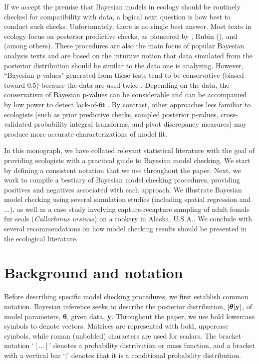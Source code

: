 \documentclass[12pt,english]{article}
\begin{document}
\begin{spacing}{1.9}
If we accept the premise that Bayesian models in ecology should be routinely checked for compatibility with data, a logical next question is how best to conduct such checks.  Unfortunately, there is no single best answer.  Most texts in ecology \citep[e.g.,][]{KingEtAl2009,LinkBarker2010,KerySchaub2012} focus on posterior predictive checks, as pioneered by \citet{Guttman1967}, Rubin (\citeyear{Rubin1981,Rubin1984}), and \citet{GelmanEtAl1996} (among others).  These procedures are also the main focus of popular Bayesian analysis texts \citep[e.g.,][]{CressieWikle2011,GelmanEtAl2014} and are based on the intuitive notion that data simulated from the posterior distribution should be similar to the data one is analyzing.  However, ``Bayesian p-values" generated from these tests tend to be conservative (biased toward 0.5) because the data are used twice \citep[once to fit the model and once to test the model;][]{BayarriBerger2000,RobinsEtAl2000}.  Depending on the data, the conservatism of Bayesian p-values can be considerable \citep{Zhang2014} and can be accompanied by low power to detect lack-of-fit \citep{YuanJohnson2012,Zhang2014}. By contrast, other approaches less familiar to ecologists (such as prior predictive checks, sampled posterior p-values, cross-validated probability integral transforms, and pivot discrepancy measures) may produce more accurate characterizations of model fit.

In this monograph, we have collated relevant statistical literature with the goal of providing ecologists with a practical guide to Bayesian model checking.  We start by defining a consistent notation that we use throughout the paper. Next, we work to compile a bestiary of Bayesian model checking procedures, providing positives and negatives associated with each approach.  We illustrate Bayesian model checking using several simulation studies (including spatial regression and ...), as well as a case study involving capture-recapture sampling of adult female fur seals (\textit{Callorhinus ursinus}) on a rookery in Alaska, U.S.A..  We conclude with several recommendations on how model checking results should be presented in the ecological literature.



\section{Background and notation}

Before describing specific model checking procedures, we first establish common notation.  Bayesian inference seeks to describe the posterior distribution, $[\boldsymbol{\theta} | {\bf y}]$, of model parameters, $\boldsymbol{\theta}$, given data, \textbf{y}.  Throughout the paper, we use bold lowercase symbols to denote vectors.  Matrices are represented with bold, uppercase symbols, while roman (unbolded) characters are used for scalars.  The bracket notation `$[ \hdots ]$' denotes a probability distribution or mass function, and a bracket with a vertical bar `$|$' denotes that it is a conditional probability distribution.


\end{spacing}
\end{document}
